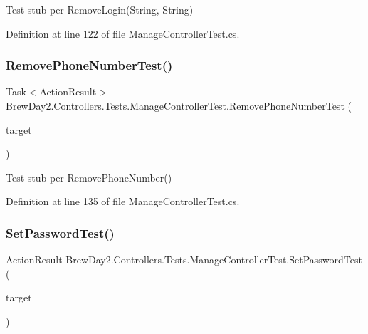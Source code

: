 Test stub per Remove\+Login(\+String, String)



Definition at line 122 of file Manage\+Controller\+Test.\+cs.

\mbox{\label{class_brew_day2_1_1_controllers_1_1_tests_1_1_manage_controller_test_a1e686a55a11caa8d22b9cb176b127763}} 
\subsubsection{\texorpdfstring{Remove\+Phone\+Number\+Test()}{RemovePhoneNumberTest()}}
{\footnotesize\ttfamily Task$<$Action\+Result$>$ Brew\+Day2.\+Controllers.\+Tests.\+Manage\+Controller\+Test.\+Remove\+Phone\+Number\+Test (\begin{DoxyParamCaption}\item[{\mbox{[}\+Pex\+Assume\+Under\+Test\mbox{]} \mbox{\hyperlink{class_brew_day2_1_1_controllers_1_1_manage_controller}{Manage\+Controller}}}]{target }\end{DoxyParamCaption})}



Test stub per Remove\+Phone\+Number()



Definition at line 135 of file Manage\+Controller\+Test.\+cs.

\mbox{\label{class_brew_day2_1_1_controllers_1_1_tests_1_1_manage_controller_test_a9e6f097c2521f513a601aa930aef845e}} 
\subsubsection{\texorpdfstring{Set\+Password\+Test()}{SetPasswordTest()}}
{\footnotesize\ttfamily Action\+Result Brew\+Day2.\+Controllers.\+Tests.\+Manage\+Controller\+Test.\+Set\+Password\+Test (\begin{DoxyParamCaption}\item[{\mbox{[}\+Pex\+Assume\+Under\+Test\mbox{]} \mbox{\hyperlink{class_brew_day2_1_1_controllers_1_1_manage_controller}{Manage\+Controller}}}]{target }\end{DoxyParamCaption})}



